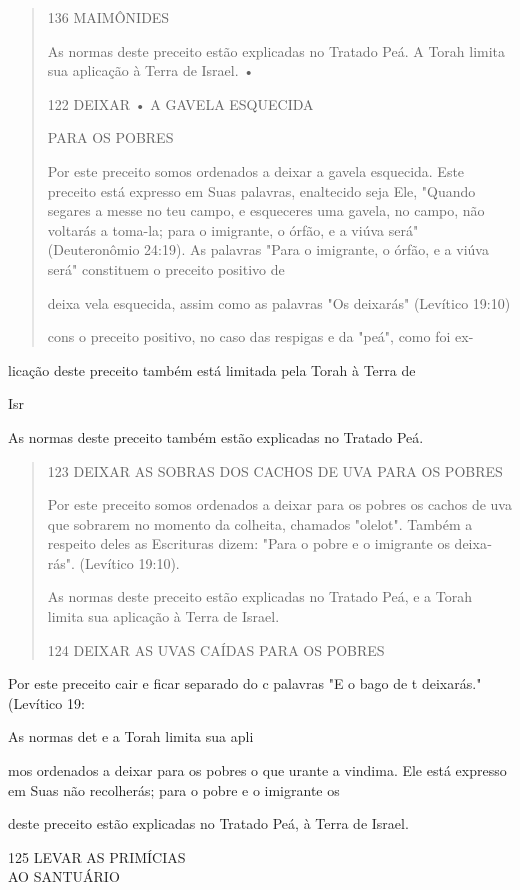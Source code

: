 \begin{quote}
136 MAIMÔNIDES

As normas deste preceito estão explicadas no Tratado Peá. A Torah limita
sua aplicação à Terra de Israel. •

122 DEIXAR • A GAVELA ESQUECIDA

PARA OS POBRES

Por este preceito somos ordenados a deixar a gavela esquecida. Este
preceito está expresso em Suas palavras, enaltecido seja Ele, "Quando
segares a messe no teu campo, e esqueceres uma gavela, no campo, não
voltarás a toma-la; para o imigrante, o órfão, e a viúva será"
(Deuteronômio 24:19). As palavras "Para o imigrante, o órfão, e a viúva
será" constituem o preceito positivo de

deixa vela esquecida, assim como as palavras "Os deixarás" (Levítico
19:10)

cons o preceito positivo, no caso das respigas e da "peá", como foi ex-
\end{quote}

licação deste preceito também está limitada pela Torah à Terra de

Isr

As normas deste preceito também estão explicadas no Tratado Peá.

\begin{quote}
123 DEIXAR AS SOBRAS DOS CACHOS DE UVA PARA OS POBRES

Por este preceito somos ordenados a deixar para os pobres os ca­chos de
uva que sobrarem no momento da colheita, chamados "olelot". Tam­bém a
respeito deles as Escrituras dizem: "Para o pobre e o imigrante os
deixa­rás". (Levítico 19:10).

As normas deste preceito estão explicadas no Tratado Peá, e a Torah
limita sua aplicação à Terra de Israel.

124 DEIXAR AS UVAS CAÍDAS PARA OS POBRES
\end{quote}

Por este preceito cair e ficar separado do c palavras "E o bago de t
deixarás." (Levítico 19:

As normas det e a Torah limita sua apli

mos ordenados a deixar para os pobres o que urante a vindima. Ele está
expresso em Suas não recolherás; para o pobre e o imigrante os

deste preceito estão explicadas no Tratado Peá, à Terra de Israel.

125 LEVAR AS PRIMÍCIAS\\
AO SANTUÁRIO

